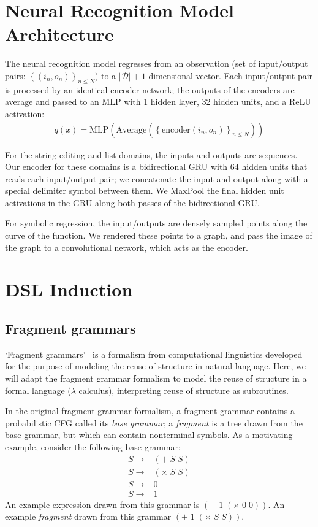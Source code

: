 \documentclass{article}
\begin{document}
\section{Neural Recognition Model Architecture}

The neural recognition model regresses from an observation (set of input/output pairs: $\left\{(i_n,o_n) \right\}_{n\leq N}$) to a $|\mathcal{D}| + 1$ dimensional vector. Each input/output pair is processed by an identical encoder network;
the outputs of the encoders are average and passed to an MLP with 1 hidden layer, 32 hidden units, and a ReLU activation:
\begin{align}
  q(x) = \text{MLP}\left(\text{Average}\left(\left\{\text{encoder}\left(i_n,o_n \right) \right\}_{n\leq N} \right) \right)
\end{align}



For the string editing and list domains,
the inputs and outputs are sequences. Our encoder for these domains is a bidirectional GRU with 64 hidden units that reads each input/output pair; we concatenate the input and output along with a special delimiter
symbol between them.
We MaxPool the final hidden unit activations in the GRU along both passes of the bidirectional GRU.

For symbolic regression,
the input/outputs are densely sampled points along the curve of the function.
We rendered these points to a graph,
and pass the image of the graph to a convolutional network,
which acts as the encoder.

\section{DSL Induction}

\subsection{Fragment grammars}

`Fragment grammars'~\cite{tim} is a formalism from computational linguistics
developed for the purpose of modeling
the reuse of structure
in natural language.
Here,
we will adapt the fragment grammar formalism
to model the reuse of structure in
a formal language ($\lambda$ calculus),
interpreting reuse of structure as subroutines.

In the original fragment grammar formalism,
a fragment grammar
contains a probabilistic CFG called its \emph{base grammar};
a \emph{fragment} is a tree drawn from the base grammar,
but which can contain nonterminal symbols.
As a motivating example,
consider the following base grammar:
\begin{align*}
  S\to&(+ \;S\; S)\\
  S\to&(\times \;S  \;S)\\
  S\to&0\\
      S\to&1  
\end{align*}
An example expression drawn from this grammar is $(+ \;1\; (\times \;0 \;0))$.
An example \emph{fragment} drawn from this grammar $(+ \;1\; (\times \;S\; S))$.
\end{document}

